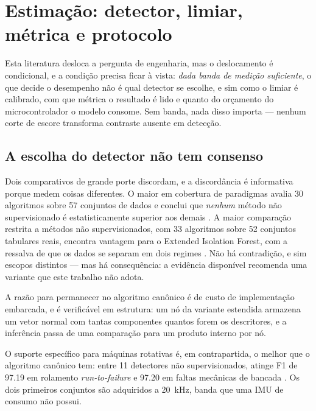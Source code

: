 \section{Estimação: detector, limiar, métrica e protocolo}
\label{sec:rev-estimacao}

Esta literatura desloca a pergunta de engenharia, mas o deslocamento é condicional, e a
condição precisa ficar à vista: \emph{dada banda de medição suficiente}, o que decide o
desempenho não é qual detector se escolhe, e sim como o limiar é calibrado, com que métrica
o resultado é lido e quanto do orçamento do microcontrolador o modelo consome. Sem banda,
nada disso importa --- nenhum corte de escore transforma contraste ausente em detecção.

\subsection{A escolha do detector não tem consenso}

Dois comparativos de grande porte discordam, e a discordância é informativa porque medem
coisas diferentes. O maior em cobertura de paradigmas avalia \num{30} algoritmos sobre
\num{57} conjuntos de dados e conclui que \emph{nenhum} método não supervisionado é
estatisticamente superior aos demais \cite{han2022}. A maior comparação restrita a métodos
não supervisionados, com \num{33} algoritmos sobre \num{52} conjuntos tabulares reais,
encontra vantagem para o Extended Isolation Forest, com a ressalva de que os dados se
separam em dois regimes \cite{bouman2024}. Não há contradição, e sim escopos distintos ---
mas há consequência: a evidência disponível recomenda uma variante que este trabalho não
adota.

A razão para permanecer no algoritmo canônico \cite{liu2008} é de custo de implementação
embarcada, e é verificável em estrutura: um nó da variante estendida armazena um vetor
normal com tantas componentes quantos forem os descritores, e a inferência passa de uma
comparação para um produto interno por nó. 

O suporte específico para máquinas rotativas é, em contrapartida, o melhor que o algoritmo
canônico tem: entre \num{11} detectores não supervisionados, atinge F1 de \num{97,19} em
rolamento \emph{run-to-failure} e \num{97,20} em faltas mecânicas de bancada
\cite{brito2022}. Os dois primeiros conjuntos são adquiridos a \SI{20}{\kilo\hertz}, banda
que uma IMU de consumo não possui.

